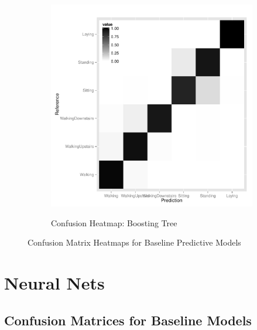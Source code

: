 \begin{landscape}
\begin{figure}
\begin{subfigure}[b]{0.45\textwidth}
    \label{fig:heatmap_rf}
  \end{subfigure}
  \hfill
    \begin{subfigure}[b]{0.45\textwidth}
    \caption{Confusion Heatmap: Boosting Tree}
    \includegraphics[width=\textwidth]{heatmap_boost.pdf}
    \label{fig:heatmap_boost}
  \end{subfigure}
  \caption{Confusion Matrix Heatmaps for Baseline Predictive Models}
\end{figure}
\end{landscape}


\section{Neural Nets} \label{nnets}




\clearpage
\begin{appendices}

\section{Confusion Matrices for Baseline Models}










%

\end{appendices}



